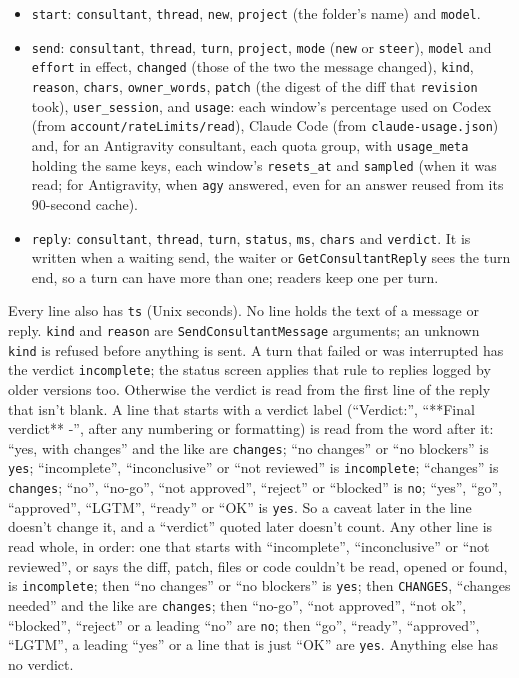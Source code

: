\documentclass[10pt,a4paper]{article}
\newcommand{\code}[1]{\texttt{#1}}
\begin{document}
\begin{itemize}
\item \code{start}: \code{consultant}, \code{thread}, \code{new}, \code{project} (the folder's
  name) and \code{model}.
\item \code{send}: \code{consultant}, \code{thread}, \code{turn}, \code{project}, \code{mode}
  (\code{new} or \code{steer}), \code{model} and \code{effort} in effect, \code{changed} (those of
  the two the message changed), \code{kind}, \code{reason}, \code{chars}, \code{owner\_words},
  \code{patch} (the digest of the diff that \code{revision} took), \code{user\_session}, and
  \code{usage}: each window's percentage used on Codex (from
  \code{account/rateLimits/read}), Claude Code (from \code{claude-usage.json}) and, for an
  Antigravity consultant, each quota group, with \code{usage\_meta} holding the same keys, each
  window's \code{resets\_at} and \code{sampled} (when it was read; for Antigravity, when \code{agy}
  answered, even for an answer reused from its 90-second cache).
\item \code{reply}: \code{consultant}, \code{thread}, \code{turn}, \code{status}, \code{ms},
  \code{chars} and \code{verdict}. It is written when a waiting send, the waiter or
  \code{GetConsultantReply} sees the turn end, so a turn can have more than one; readers keep one
  per turn.
\end{itemize}

Every line also has \code{ts} (Unix seconds). No line holds the text of a message or reply.
\code{kind} and \code{reason} are \code{SendConsultantMessage} arguments; an unknown \code{kind}
is refused before anything is sent. A turn that failed or was interrupted has the verdict
\code{incomplete}; the status screen applies that rule to replies logged by older versions too.
Otherwise the verdict is read from the first line of the reply that isn't blank. A line that starts
with a verdict label (``Verdict:'', ``**Final verdict** -'', after any numbering or formatting) is
read from the word after it: ``yes, with changes'' and the like are \code{changes}; ``no changes''
or ``no blockers'' is \code{yes}; ``incomplete'', ``inconclusive'' or ``not reviewed'' is
\code{incomplete}; ``changes'' is \code{changes}; ``no'', ``no-go'', ``not approved'', ``reject''
or ``blocked'' is \code{no}; ``yes'', ``go'', ``approved'', ``LGTM'', ``ready'' or ``OK'' is
\code{yes}. So a caveat later in the line doesn't change it, and a ``verdict'' quoted later doesn't
count. Any other line is read whole, in order: one that starts with ``incomplete'',
``inconclusive'' or ``not reviewed'', or says the diff, patch, files or code couldn't be read,
opened or found, is \code{incomplete}; then ``no changes'' or ``no blockers'' is \code{yes}; then
\code{CHANGES}, ``changes needed'' and the like are \code{changes}; then ``no-go'', ``not
approved'', ``not ok'', ``blocked'', ``reject'' or a leading ``no'' are \code{no}; then ``go'',
``ready'', ``approved'', ``LGTM'', a leading ``yes'' or a line that is just ``OK'' are \code{yes}.
Anything else has no verdict.
\end{document}
